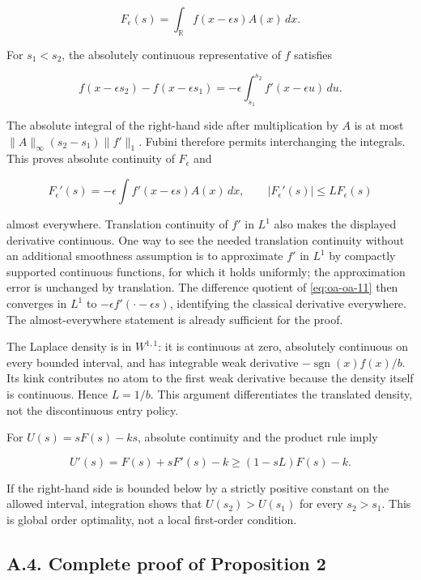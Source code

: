 \documentclass[
  11pt,
]{article}
\begin{document}
\[
F_\epsilon(s)=\int_{\mathbb R}f(x-\epsilon s)A(x)\,dx.
\tag{OA.10}\label{eq:oa-oa-10}
\]

For \(s_1<s_2\), the absolutely continuous representative of \(f\)
satisfies

\[
f(x-\epsilon s_2)-f(x-\epsilon s_1)
=-\epsilon\int_{s_1}^{s_2}f'(x-\epsilon u)\,du.
\tag{OA.11}\label{eq:oa-oa-11}
\]

The absolute integral of the right-hand side after multiplication by
\(A\) is at most \(\|A\|_\infty(s_2-s_1)\|f'\|_1\). Fubini therefore
permits interchanging the integrals. This proves absolute continuity of
\(F_\epsilon\) and

\[
F_\epsilon'(s)=-\epsilon\int f'(x-\epsilon s)A(x)\,dx,
\qquad |F_\epsilon'(s)|\le L F_\epsilon(s)
\tag{OA.12}\label{eq:oa-oa-12}
\]

almost everywhere. Translation continuity of \(f'\) in \(L^1\) also
makes the displayed derivative continuous. One way to see the needed
translation continuity without an additional smoothness assumption is to
approximate \(f'\) in \(L^1\) by compactly supported continuous
functions, for which it holds uniformly; the approximation error is
unchanged by translation. The difference quotient of \eqref{eq:oa-oa-11}
then converges in \(L^1\) to \(-\epsilon f'(\cdot-\epsilon s)\),
identifying the classical derivative everywhere. The almost-everywhere
statement is already sufficient for the proof.

The Laplace density is in \(W^{1,1}\): it is continuous at zero,
absolutely continuous on every bounded interval, and has integrable weak
derivative \(-\operatorname{sgn}(x)f(x)/b\). Its kink contributes no
atom to the first weak derivative because the density itself is
continuous. Hence \(L=1/b\). This argument differentiates the translated
density, not the discontinuous entry policy.

For \(U(s)=sF(s)-ks\), absolute continuity and the product rule imply

\[
U'(s)=F(s)+sF'(s)-k\ge(1-sL)F(s)-k.
\tag{OA.13}\label{eq:oa-oa-13}
\]

If the right-hand side is bounded below by a strictly positive constant
on the allowed interval, integration shows that \(U(s_2)>U(s_1)\) for
every \(s_2>s_1\). This is global order optimality, not a local
first-order condition.

\subsection{A.4. Complete proof of Proposition 2}\label{oa-a-entry}
\end{document}
